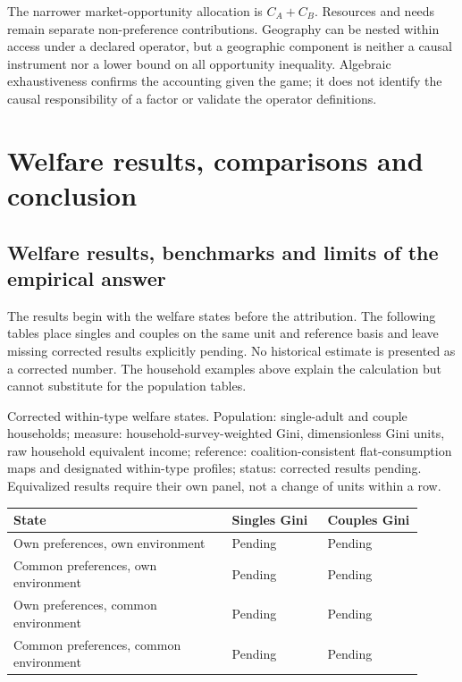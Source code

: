 \documentclass[11pt,a4paper]{article}
\begin{document}
The narrower market-opportunity allocation is \(C_A+C_B\). Resources and needs remain separate non-preference contributions. Geography can be nested within access under a declared operator, but a geographic component is neither a causal instrument nor a lower bound on all opportunity inequality. Algebraic exhaustiveness confirms the accounting given the game; it does not identify the causal responsibility of a factor or validate the operator definitions.

\section{Welfare results, comparisons and conclusion}\label{welfare-results-comparisons-and-conclusion}

\subsection{Welfare results, benchmarks and limits of the empirical answer}\label{welfare-results-benchmarks-and-limits-of-the-empirical-answer}

The results begin with the welfare states before the attribution. The following tables place singles and couples on the same unit and reference basis and leave missing corrected results explicitly pending. No historical estimate is presented as a corrected number. The household examples above explain the calculation but cannot substitute for the population tables.

Corrected within-type welfare states. Population: single-adult and couple households; measure: household-survey-weighted Gini, dimensionless Gini units, raw household equivalent income; reference: coalition-consistent flat-consumption maps and designated within-type profiles; status: corrected results pending. Equivalized results require their own panel, not a change of units within a row.

{ %
\small\setlength{\tabcolsep}{3pt}\begin{longtable}[]{@{}>{\raggedright\arraybackslash}p{0.4800\linewidth}>{\raggedright\arraybackslash}p{0.2150\linewidth}>{\raggedright\arraybackslash}p{0.2150\linewidth}@{}}
\toprule\noalign{}
State & Singles Gini & Couples Gini \\
\midrule\noalign{}
\endhead
\bottomrule\noalign{}
\endlastfoot
Own preferences, own environment & Pending & Pending \\
Common preferences, own environment & Pending & Pending \\
Own preferences, common environment & Pending & Pending \\
Common preferences, common environment & Pending & Pending \\
\end{longtable}
}
\end{document}
